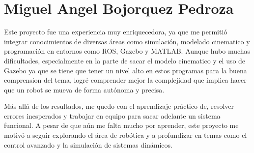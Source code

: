 \section{Miguel Angel Bojorquez Pedroza}
Este proyecto fue una experiencia muy enriquecedora, ya que me permitió integrar conocimientos de diversas áreas como simulación, modelado cinematico y programación en entornos como ROS, Gazebo y MATLAB. Aunque hubo muchas dificultades, especialmente en la parte de sacar el modelo cinematico y el uso de Gazebo ya que se tiene que tener un nivel alto en estos programas para la buena comprension del tema, logré comprender mejor la complejidad que implica hacer que un robot se mueva de forma autónoma y precisa.

Más allá de los resultados, me quedo con el aprendizaje práctico de, resolver errores inesperados y trabajar en equipo para sacar adelante un sistema funcional. A pesar de que aún me falta mucho por aprender, este proyecto me motivó a seguir explorando el área de robótica y a profundizar en temas como el control avanzado y la simulación de sistemas dinámicos.